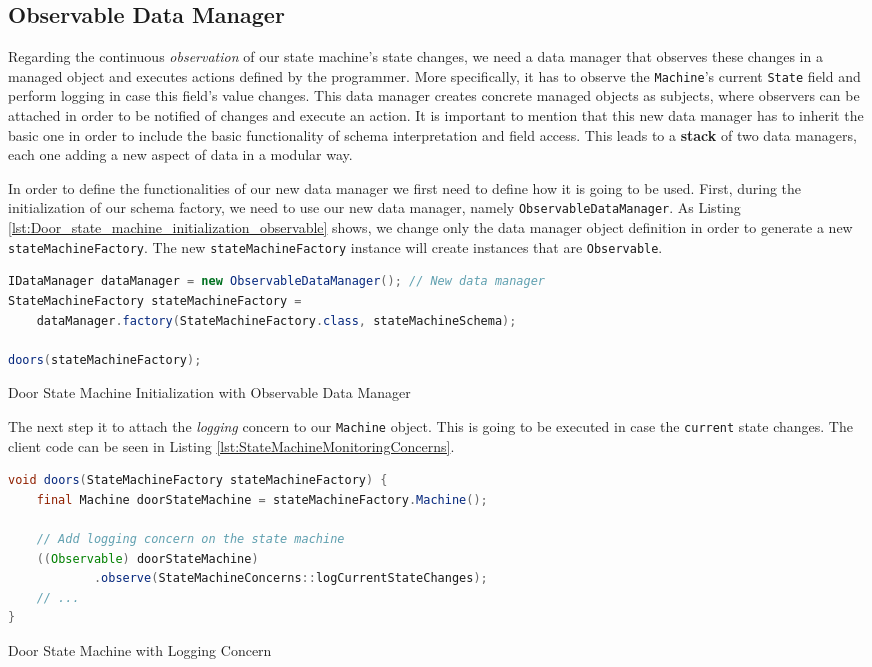 \subsection{Observable Data Manager}
Regarding the continuous \textit{observation} of our state machine's state changes, we need a data manager that observes these changes in a managed object and executes actions defined by the programmer.
More specifically, it has to observe the \texttt{Machine}'s current \texttt{State} field and perform logging in case this field's value changes.
This data manager creates concrete managed objects as subjects, where observers can be attached in order to be notified of changes and execute an action.
It is important to mention that this new data manager has to inherit the basic one in order to include the basic functionality of schema interpretation and field access.
This leads to a \textbf{stack} of two data managers, each one adding a new aspect of data in a modular way.

In order to define the functionalities of our new data manager we first need to define how it is going to be used.
First, during the initialization of our schema factory, we need to use our new data manager, namely \texttt{ObservableDataManager}.
As Listing \ref{lst:Door_state_machine_initialization_observable} shows, we change only the data manager object definition in order to generate a new \texttt{stateMachineFactory}.
The new \texttt{stateMachineFactory} instance will create instances that are \texttt{Observable}.

\begin{sourcecode} [H]
	\begin{lstlisting}[language=Java, escapechar=|]
IDataManager dataManager = new ObservableDataManager(); // New data manager
StateMachineFactory stateMachineFactory =
	dataManager.factory(StateMachineFactory.class, stateMachineSchema);

doors(stateMachineFactory);
	\end{lstlisting}
	\caption{Door State Machine Initialization with Observable Data Manager}
	\label{lst:Door_state_machine_initialization_observable}
\end{sourcecode}

The next step it to attach the \textit{logging} concern to our \texttt{Machine} object. 
This is going to be executed in case the \texttt{current} state changes.
The client code can be seen in Listing \ref{lst:StateMachineMonitoringConcerns}.

\begin{sourcecode} [H]
	\begin{lstlisting}[language=Java, escapechar=|]
void doors(StateMachineFactory stateMachineFactory) {
	final Machine doorStateMachine = stateMachineFactory.Machine();

	// Add logging concern on the state machine
	((Observable) doorStateMachine)
			.observe(StateMachineConcerns::logCurrentStateChanges);
	// ...
}
	\end{lstlisting}
	\caption{Door State Machine with Logging Concern}
	\label{lst:StateMachineMonitoringConcerns}
\end{sourcecode}

